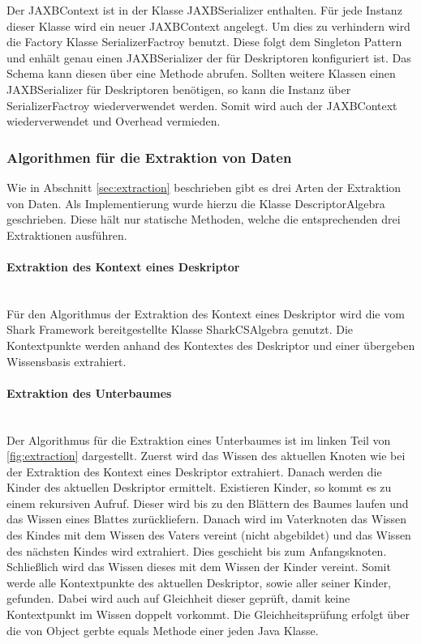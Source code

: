 \documentclass[a4paper]{article}
\begin{document}
	Der JAXBContext ist in der Klasse JAXBSerializer enthalten. Für jede Instanz
	dieser Klasse wird ein neuer JAXBContext angelegt. Um dies zu verhindern wird
	die Factory Klasse SerializerFactroy benutzt. Diese folgt dem Singleton Pattern
	und enhält genau einen JAXBSerializer der für Deskriptoren konfiguriert ist. 
	Das Schema kann diesen über eine Methode abrufen. Sollten weitere Klassen
	einen JAXBSerializer für Deskriptoren benötigen, so kann die Instanz 
	über SerializerFactroy wiederverwendet werden. Somit wird auch der JAXBContext
	wiederverwendet und Overhead vermieden.
	
	\subsubsection{Algorithmen für die Extraktion von Daten}
	
	Wie in Abschnitt \ref{sec:extraction} beschrieben gibt es drei Arten der
	Extraktion von Daten. Als Implementierung wurde hierzu die Klasse
	DescriptorAlgebra geschrieben. Diese hält nur statische Methoden, welche die
	entsprechenden drei Extraktionen ausführen. 
	
	\paragraph{Extraktion des Kontext eines Deskriptor}\mbox{} \\
	
	Für den Algorithmus der Extraktion des Kontext eines Deskriptor wird
	die vom Shark Framework bereitgestellte Klasse SharkCSAlgebra genutzt.
	Die Kontextpunkte werden anhand des Kontextes des Deskriptor und einer
	übergeben Wissensbasis extrahiert.
	
	\paragraph{Extraktion des Unterbaumes}\mbox{} \\
	
	Der Algorithmus für die Extraktion eines Unterbaumes ist im linken Teil von
	\autoref{fig:extraction} dargestellt. Zuerst wird das Wissen des aktuellen
	Knoten wie bei der Extraktion des Kontext eines Deskriptor extrahiert.
	Danach werden die Kinder des aktuellen Deskriptor ermittelt. Existieren
	Kinder, so kommt es zu einem rekursiven Aufruf. Dieser wird bis zu den Blättern
	des Baumes laufen und das Wissen eines Blattes zurückliefern. Danach wird
	im Vaterknoten das Wissen des Kindes mit dem Wissen des Vaters vereint (nicht 
	abgebildet) und das Wissen des nächsten Kindes wird extrahiert. Dies geschieht
	bis zum Anfangsknoten. Schließlich wird das Wissen dieses mit dem Wissen der
	Kinder vereint. Somit werde alle Kontextpunkte des aktuellen
	Deskriptor,	sowie aller seiner Kinder, gefunden. Dabei wird auch auf Gleichheit
	dieser geprüft, damit keine Kontextpunkt im Wissen doppelt vorkommt. Die
	Gleichheitsprüfung erfolgt über die von Object gerbte equals Methode einer jeden
	Java Klasse.
	
\end{document}
